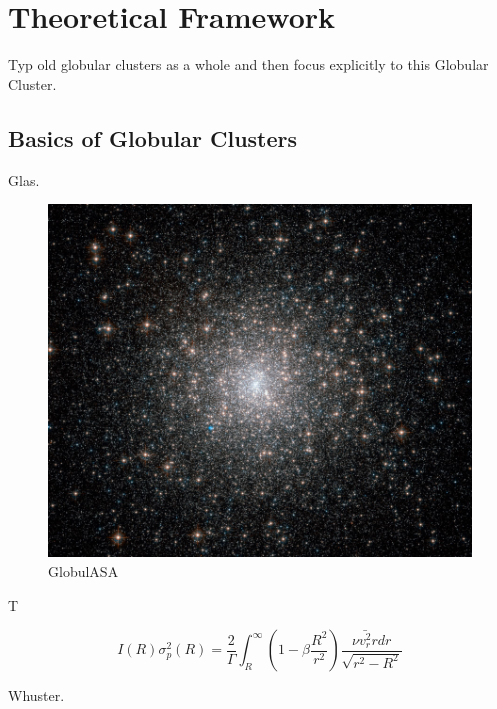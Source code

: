 \chapter{Theoretical Framework}

Typ old globular clusters as a whole and then focus explicitly to this Globular Cluster. 

\section{Basics of Globular Clusters}
 
Glas.

\begin{figure}[H]
\centering
\includegraphics[width=12cm]{images/m15.jpg}
\caption[M15 ter]{GlobulASA}
\end{figure}

T 

\begin{equation}
I(R)\sigma_{p}^{2}(R)=\frac{2}{\Gamma}\int_{R}^{\infty}\left(1-\beta\frac{R^{2}}{r^{2}}\right)\frac{\nu\bar{v_{r}^{2}}rdr}{\sqrt{r^{2}-R^{2}}}
\end{equation}

Whuster.  

